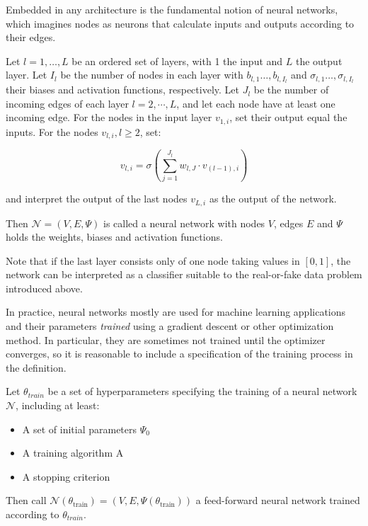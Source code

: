 Embedded in any architecture is the fundamental notion of neural networks, which imagines nodes as neurons that calculate inputs and outputs according to their edges.

\begin{definition}
    Let $l = 1, \dots, L$ be an ordered set of layers, with 1 the input and $L$ the output layer.
    Let $I_l$ be the number of nodes in each layer with $b_{l,1} \dots, b_{l,I_l}$ and $\sigma_{l,1} \dots, \sigma_{l,I_l}$ their biases and activation functions, respectively.
    Let $J_l$ be the number of incoming edges of each layer $l = 2, \cdots, L$, and let each node have at least one incoming edge.
    For the nodes in the input layer $v_{1,i}$, set their output equal the inputs.
    For the nodes $v_{l,i}, l \geq 2$, set:

    \begin{equation}
        v_{l,i} = \sigma (\sum_{j = 1}^{J_l} w_{l,J} \cdot v_{(l-1),i})
    \end{equation}

    and interpret the output of the last nodes $v_{L,i}$ as the output of the network.

    Then $\mathcal{N} = (V, E, \Psi)$ is called a neural network
    with nodes $V$, edges $E$ and $\Psi$ holds the weights, biases and activation functions.%
\end{definition}

Note that if the last layer consists only of one node taking values in $[0,1]$, the network can be interpreted as a classifier suitable to the real-or-fake data problem introduced above.

In practice, neural networks mostly are used for machine learning applications and their parameters \textit{trained} using a gradient descent or other optimization method.
In particular, they are sometimes not trained until the optimizer converges, so it is reasonable to include a specification of the training process in the definition.

\begin{definition}
    Let $\theta_{train}$ be a set of hyperparameters specifying the training of a neural network $\mathcal{N}$, including at least:
    \begin{itemize}
        \item A set of initial parameters $\Psi_0$
        \item A training algorithm A
        \item A stopping criterion
    \end{itemize}
    Then call  $\mathcal{N}(\theta_{\text{train}}) = (V, E, \Psi(\theta_{\text{train}}))$ a feed-forward neural network trained according to $\theta_{train}$.
\end{definition}

